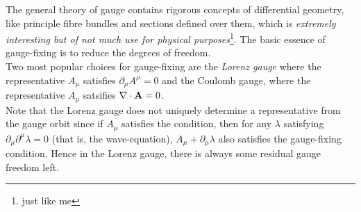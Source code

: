 \noindent
The general theory of gauge contains rigorous concepts of differential geometry, like principle fibre bundles and sections defined over them, which is \textit{extremely interesting but of not much use for physical purposes}\footnote{just like me}. The basic essence of gauge-fixing is to reduce the degrees of freedom. \\[0.2cm]
Two most popular choices for gauge-fixing are the \textit{Lorenz gauge} where the representative $A_\mu$ satisfies $\partial_\mu A^\mu=0$  and the Coulomb gauge, where the representative $A_\mu$ satsifies $\nabla\cdot \vb{A} = 0$.\\[0.2cm] Note that the Lorenz gauge does not uniquely determine a representative from the gauge orbit since if $A_\mu$ satisfies the condition, then for any $\lambda$ satisfying $\partial_\mu \partial^\mu \lambda=0$ (that is, the wave-equation), $A_\mu+\partial_\mu\lambda$ also satisfies the gauge-fixing condition. Hence in the Lorenz gauge, there is always some residual gauge freedom left.

